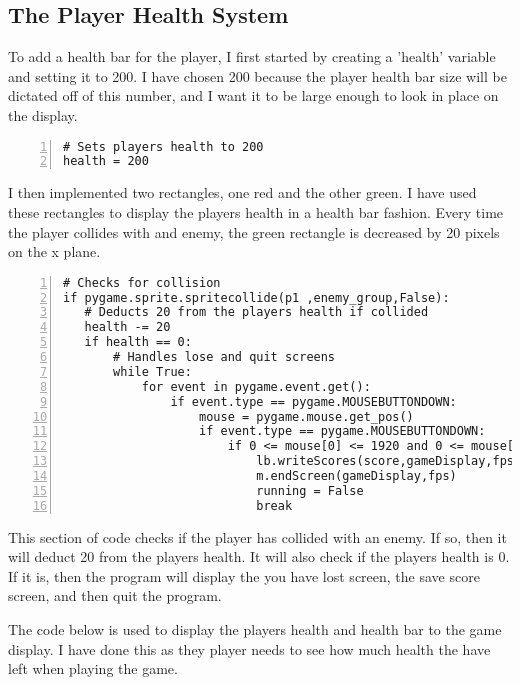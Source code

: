 \documentclass[12pt]{report}
\begin{document}
\subsection{The Player Health System}
To add a health bar for the player, I first started by creating a 'health' variable and setting it to 200. I have chosen 200 because the player health bar size will be dictated off of this number, and I want it to be large enough to look in place on the display.

\begin{Verbatim}[numbers=left, frame=single] 
# Sets players health to 200
health = 200
\end{Verbatim}

I then implemented two rectangles, one red and the other green. I have used these rectangles to display the players health in a health bar fashion. Every time the player collides with and enemy, the green rectangle is decreased by 20 pixels on the x plane.

\small

\begin{Verbatim}[numbers=left, frame=single] 
# Checks for collision
if pygame.sprite.spritecollide(p1 ,enemy_group,False):
   # Deducts 20 from the players health if collided
   health -= 20
   if health == 0:
       # Handles lose and quit screens 
       while True:                                                             
           for event in pygame.event.get():
               if event.type == pygame.MOUSEBUTTONDOWN:
                   mouse = pygame.mouse.get_pos()
                   if event.type == pygame.MOUSEBUTTONDOWN:
                       if 0 <= mouse[0] <= 1920 and 0 <= mouse[1] <= 1080:
                           lb.writeScores(score,gameDisplay,fps,username)
                           m.endScreen(gameDisplay,fps)
                           running = False
                           break
\end{Verbatim}

\normalsize

This section of code checks if the player has collided with an enemy. If so, then it will deduct 20 from the players health. It will also check if the players health is 0. If it is, then the program will display the you have lost screen, the save score screen, and then quit the program. 

The code below is used to display the players health and health bar to the game display. I have done this as they player needs to see how much health the have left when playing the game.
\end{document}
